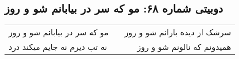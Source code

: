 \begin{center}
\section*{دوبیتی شماره ۶۸: مو که سر در بیابانم شو و روز}
\label{sec:068}
\begin{longtable}{l p{0.5cm} r}
مو که سر در بیابانم شو و روز
&&
سرشک از دیده بارانم شو و روز
\\
نه تب دیرم نه جایم میکند درد
&&
همیدونم که نالونم شو و روز
\\
\end{longtable}
\end{center}
